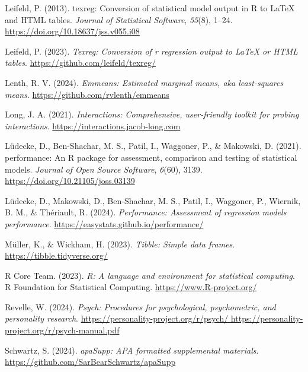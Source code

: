 \documentclass[
]{article}
\newlength{\cslhangindent}
\newlength{\cslentryspacingunit} %
\newenvironment{CSLReferences}[2] %
 {%
  \setlength{\parindent}{0pt}
  \ifodd #1
  \let\oldpar\par
  \def\par{\hangindent=\cslhangindent\oldpar}
  \fi
  \setlength{\parskip}{#2\cslentryspacingunit}
 }%
 {}
\begin{document}
\begin{CSLReferences}{1}{0}
\leavevmode{}%
Leifeld, P. (2013). {texreg}: Conversion of statistical model output in
{R} to {LaTeX} and {HTML} tables. \emph{Journal of Statistical
Software}, \emph{55}(8), 1--24.
\url{https://doi.org/10.18637/jss.v055.i08}

\leavevmode{}%
Leifeld, P. (2023). \emph{Texreg: Conversion of r regression output to
LaTeX or HTML tables}. \url{https://github.com/leifeld/texreg/}

\leavevmode{}%
Lenth, R. V. (2024). \emph{Emmeans: Estimated marginal means, aka
least-squares means}. \url{https://github.com/rvlenth/emmeans}

\leavevmode{}%
Long, J. A. (2021). \emph{Interactions: Comprehensive, user-friendly
toolkit for probing interactions}.
\url{https://interactions.jacob-long.com}

\leavevmode{}%
Lüdecke, D., Ben-Shachar, M. S., Patil, I., Waggoner, P., \& Makowski,
D. (2021). {performance}: An {R} package for assessment, comparison and
testing of statistical models. \emph{Journal of Open Source Software},
\emph{6}(60), 3139. \url{https://doi.org/10.21105/joss.03139}

\leavevmode{}%
Lüdecke, D., Makowski, D., Ben-Shachar, M. S., Patil, I., Waggoner, P.,
Wiernik, B. M., \& Thériault, R. (2024). \emph{Performance: Assessment
of regression models performance}.
\url{https://easystats.github.io/performance/}

\leavevmode{}%
Müller, K., \& Wickham, H. (2023). \emph{Tibble: Simple data frames}.
\url{https://tibble.tidyverse.org/}

\leavevmode{}%
R Core Team. (2023). \emph{R: A language and environment for statistical
computing}. R Foundation for Statistical Computing.
\url{https://www.R-project.org/}

\leavevmode{}%
Revelle, W. (2024). \emph{Psych: Procedures for psychological,
psychometric, and personality research}.
\href{https://personality-project.org/r/psych/\%0Ahttps://personality-project.org/r/psych-manual.pdf}{https://personality-project.org/r/psych/
https://personality-project.org/r/psych-manual.pdf}

\leavevmode{}%
Schwartz, S. (2024). \emph{apaSupp: APA formatted supplemental
materials}. \url{https://github.com/SarBearSchwartz/apaSupp}


\end{CSLReferences}
\end{document}
